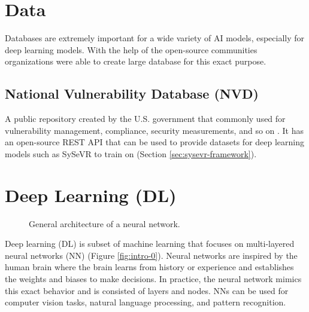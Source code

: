 \documentclass[12pt,twocolumn,letterpaper]{article}
\begin{document}
\section{Data}
\label{sec:data}

Databases are extremely important for a wide variety of AI models, especially for deep learning models. 
With the help of the open-source communities organizations were able to create large database for this 
exact purpose.

\subsection{National Vulnerability Database (NVD)}
\label{sub:nvd}

A public repository created by the U.S. government that commonly used for vulnerability management, 
compliance, security measurements, and so on \cite{Nist00}. It has an open-source REST API that can be 
used to provide datasets for deep learning models such as SySeVR to train on (Section \ref{sec:sysevr-framework}).

\section{Deep Learning (DL)}
\label{sec:deep-learning}

\begin{figure}[t]
    \centering
    \caption{General architecture of a neural network.}
    \label{fig:dl-0}
\end{figure}

Deep learning (DL) is subset of machine learning that focuses on multi-layered neural networks (NN)
(Figure \ref{fig:intro-0}). Neural networks are inspired by the human brain where the brain learns from 
history or experience and establishes the weights and biases to make decisions. In practice, the neural 
network mimics this exact behavior and is consisted of layers and nodes. NNs can be used for computer vision 
tasks, natural language processing, and pattern recognition.
\end{document}
